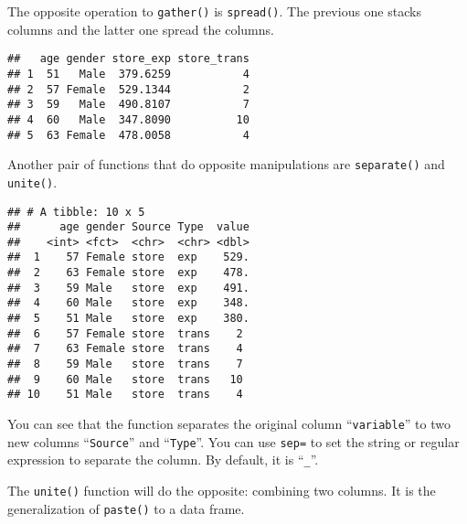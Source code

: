 \documentclass[
]{article}
\newenvironment{Shaded}{\begin{snugshade}}{\end{snugshade}}
\newcommand{\KeywordTok}[1]{\textcolor[rgb]{0.13,0.29,0.53}{\textbf{#1}}}
\newcommand{\NormalTok}[1]{#1}
\newcommand{\OperatorTok}[1]{\textcolor[rgb]{0.81,0.36,0.00}{\textbf{#1}}}
\newcommand{\StringTok}[1]{\textcolor[rgb]{0.31,0.60,0.02}{#1}}
\begin{document}
The opposite operation to \texttt{gather()} is \texttt{spread()}. The
previous one stacks columns and the latter one spread the columns.

\begin{Shaded}
\end{Shaded}

\begin{verbatim}
##   age gender store_exp store_trans
## 1  51   Male  379.6259           4
## 2  57 Female  529.1344           2
## 3  59   Male  490.8107           7
## 4  60   Male  347.8090          10
## 5  63 Female  478.0058           4
\end{verbatim}

Another pair of functions that do opposite manipulations are
\texttt{separate()} and \texttt{unite()}.

\begin{Shaded}
\end{Shaded}

\begin{verbatim}
## # A tibble: 10 x 5
##      age gender Source Type  value
##    <int> <fct>  <chr>  <chr> <dbl>
##  1    57 Female store  exp    529.
##  2    63 Female store  exp    478.
##  3    59 Male   store  exp    491.
##  4    60 Male   store  exp    348.
##  5    51 Male   store  exp    380.
##  6    57 Female store  trans    2 
##  7    63 Female store  trans    4 
##  8    59 Male   store  trans    7 
##  9    60 Male   store  trans   10 
## 10    51 Male   store  trans    4
\end{verbatim}

You can see that the function separates the original column
``\texttt{variable}'' to two new columns ``\texttt{Source}'' and
``\texttt{Type}''. You can use \texttt{sep=} to set the string or
regular expression to separate the column. By default, it is
``\texttt{\_}''.

The \texttt{unite()} function will do the opposite: combining two
columns. It is the generalization of \texttt{paste()} to a data frame.
\end{document}
